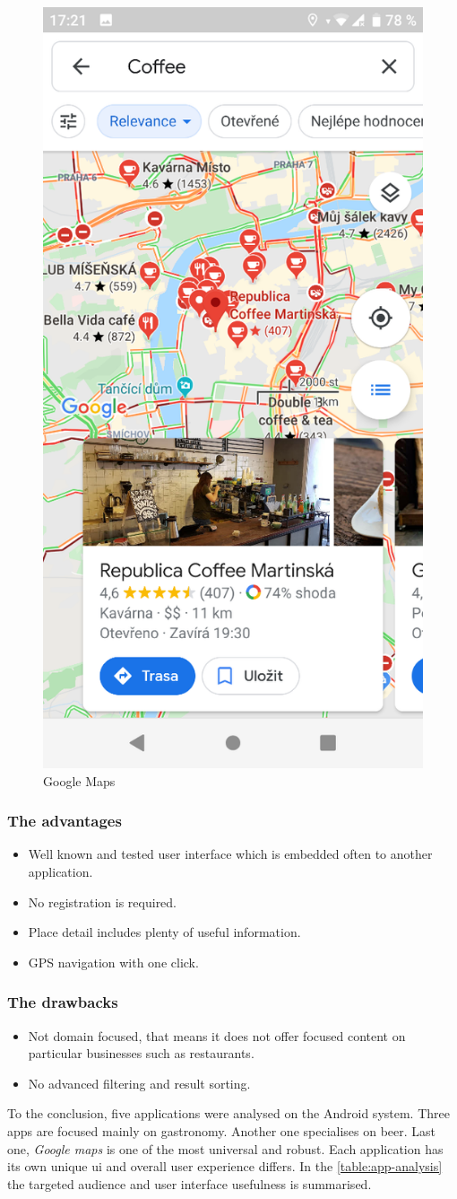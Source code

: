 \begin{figure}[ht]
    \centering
    \includegraphics[width=0.33\linewidth]{img/analysis/gmaps.png}
    \caption{Google Maps}
    \label{fig:google-maps}
\end{figure}

\subsubsection{The advantages}
\begin{itemize}
    \item Well known and tested user interface which is embedded often to another application.
    \item No registration is required.
    \item Place detail includes plenty of useful information.
    \item GPS navigation with one click.
\end{itemize}

\subsubsection{The drawbacks}
\begin{itemize}
    \item Not domain focused, that means it does not offer focused content on particular businesses such as restaurants.
    \item No advanced filtering and result sorting.
\end{itemize}

To the conclusion, five applications were analysed on the Android system. Three apps are focused mainly on gastronomy. Another one specialises on beer. Last one, \textit{Google maps} is one of the most universal and robust. 
Each application has its own unique \gls{ui}  and overall user experience differs. In the \cref{table:app-analysis} the targeted audience and user interface usefulness is summarised.

